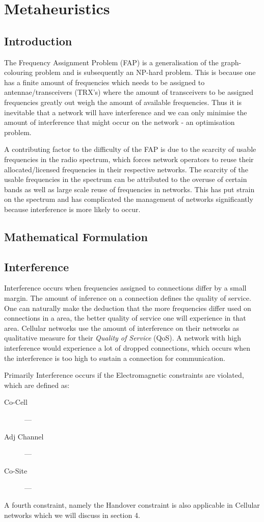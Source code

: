 \chapter{Metaheuristics}
\section{Introduction}
The Frequency Assignment Problem (FAP) is a generalisation of the graph-colouring problem and is subsequently an NP-hard problem. This is because one has a finite amount of frequencies which needs to be 
assigned to antennae/transceivers (TRX's)  where the amount of transceivers to be assigned frequencies greatly out weigh the amount of available frequencies. Thus it is inevitable that a network will 
have interference and we can only minimise the amount of interference that might occur on the network - an optimisation problem. 

A contributing factor to the difficulty of the FAP is due to the scarcity of usable frequencies in the radio spectrum, which forces network operators to reuse their allocated/licensed frequencies in their respective networks. The scarcity of the usable frequencies in the spectrum can be attributed to the overuse of certain bands as well as large scale reuse of frequencies in networks. This has put strain on the spectrum and has complicated the management of networks significantly because interference is more likely to occur.
\section{Mathematical Formulation}
\section{Interference}
Interference occurs when frequencies assigned to connections differ by a small margin. The amount of inference on a connection defines the quality of service. One can naturally make the deduction that 
the more frequencies differ used on connections in a area, the better quality of service one will experience in that area. Cellular networks use the amount of interference on their networks as 
qualitative measure for their \emph{Quality of Service} (QoS). A network with high interference would experience a lot of dropped connections, which occurs when the interference is too high to sustain a connection for communication.

Primarily Interference occurs if the Electromagnetic constraints are violated, which are defined as:
\begin{description}
\item[Co-Cell] ---
\item[Adj Channel] ---
\item[Co-Site] ---
\end{description}
A fourth constraint, namely the Handover constraint is also applicable in Cellular networks which we will discuss in section 4.

